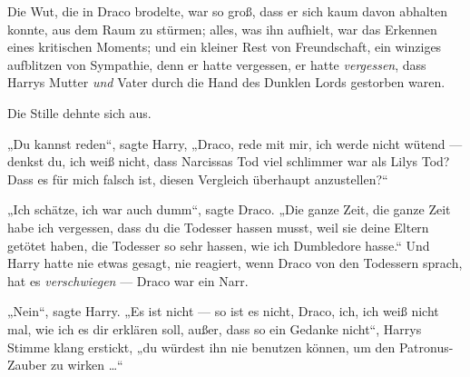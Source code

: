 Die Wut, die in Draco brodelte, war so groß, dass er sich kaum davon abhalten konnte, aus dem Raum zu stürmen; alles, was ihn aufhielt, war das Erkennen eines kritischen Moments; und ein kleiner Rest von Freundschaft, ein winziges aufblitzen von Sympathie, denn er hatte vergessen, er hatte \emph{vergessen}, dass Harrys Mutter \emph{und} Vater durch die Hand des Dunklen Lords gestorben waren.

Die Stille dehnte sich aus.

„Du kannst reden“, sagte Harry,
„Draco, rede mit mir, ich werde nicht wütend — denkst du, ich weiß nicht, dass Narcissas Tod viel schlimmer war als Lilys Tod? Dass es für mich falsch ist, diesen Vergleich überhaupt anzustellen?“

„Ich schätze, ich war auch dumm“, sagte Draco.
„Die ganze Zeit, die ganze Zeit habe ich vergessen, dass du die Todesser hassen musst, weil sie deine Eltern getötet haben, die Todesser so sehr hassen, wie ich Dumbledore hasse.“ Und Harry hatte nie etwas gesagt, nie reagiert, wenn Draco von den Todessern sprach, hat es \emph{verschwiegen} — Draco war ein Narr.

„Nein“, sagte Harry.
„Es ist nicht — so ist es nicht, Draco, ich, ich weiß nicht mal, wie ich es dir erklären soll, außer, dass so ein Gedanke nicht“, Harrys Stimme klang erstickt, „du würdest ihn nie benutzen können, um den Patronus-Zauber zu wirken …“

